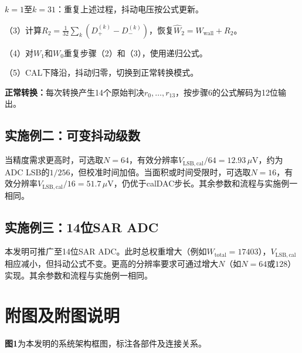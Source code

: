 \documentclass[UTF8,a4paper,11pt]{ctexart}
\begin{document}
$k=1$至$k=31$：重复上述过程，抖动电压按公式更新。

（3）计算$R_2 = \frac{1}{32}\sum_k (D_+^{(k)} - D_-^{(k)})$，恢复$\widehat{W}_2 = W_{\mathrm{wall}} + R_2$。

（4）对$W_1$和$W_0$重复步骤（2）和（3），使用递归公式。

（5）CAL下降沿，抖动归零，切换到正常转换模式。

\textbf{正常转换：}每次转换产生14个原始判决$r_0, \ldots, r_{13}$，按步骤6的公式解码为12位输出。

\subsection{实施例二：可变抖动级数}

当精度需求更高时，可选取$N=64$，有效分辨率$V_{\mathrm{LSB,cal}}/64 = 12.93\,\mu\mathrm{V}$，约为ADC LSB的$1/256$，但校准时间加倍。当面积或时间受限时，可选取$N=16$，有效分辨率$V_{\mathrm{LSB,cal}}/16 = 51.7\,\mu\mathrm{V}$，仍优于calDAC步长。其余参数和流程与实施例一相同。

\subsection{实施例三：14位SAR ADC}

本发明可推广至14位SAR ADC。此时总权重增大（例如$W_{\mathrm{total}} = 17403$），$V_{\mathrm{LSB,cal}}$相应减小，但抖动公式不变。更高的分辨率要求可通过增大$N$（如$N=64$或$128$）实现。其余参数和流程与实施例一相同。

\section{附图及附图说明}

\textbf{图1}为本发明的系统架构框图，标注各部件及连接关系。
\end{document}
